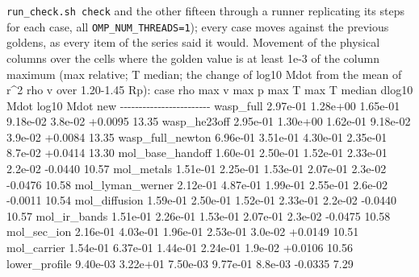\documentclass[english,a4paper]{my_memo}
\begin{document}
\begin{itemize}
  \texttt{run\_check.sh\ check} and the other fifteen through a runner replicating
  its steps for each case, all \texttt{OMP\_NUM\_THREADS=1}); every case moves against
  the previous goldens, as every item of the series said it would.
  Movement of the physical columns over the cells where the golden value
  is at least 1e-3 of the column maximum (max relative; T median; the
  change of log10 Mdot from the mean of r\^{}2 rho v over 1.20-1.45 Rp):
  \textbar{} case \textbar{} rho max \textbar{} v max \textbar{} p max \textbar{} T max \textbar{} T median \textbar{} dlog10 Mdot \textbar{} log10 Mdot new \textbar{}
  \textbar-\/-\/-\textbar-\/-\/-\textbar-\/-\/-\textbar-\/-\/-\textbar-\/-\/-\textbar-\/-\/-\textbar-\/-\/-\textbar-\/-\/-\textbar{}
  \textbar{} wasp\_full \textbar{} 2.97e-01 \textbar{} 1.28e+00 \textbar{} 1.65e-01 \textbar{} 9.18e-02 \textbar{} 3.8e-02 \textbar{} +0.0095 \textbar{} 13.35 \textbar{}
  \textbar{} wasp\_he23off \textbar{} 2.95e-01 \textbar{} 1.30e+00 \textbar{} 1.62e-01 \textbar{} 9.18e-02 \textbar{} 3.9e-02 \textbar{} +0.0084 \textbar{} 13.35 \textbar{}
  \textbar{} wasp\_full\_newton \textbar{} 6.96e-01 \textbar{} 3.51e-01 \textbar{} 4.30e-01 \textbar{} 2.35e-01 \textbar{} 8.7e-02 \textbar{} +0.0414 \textbar{} 13.30 \textbar{}
  \textbar{} mol\_base\_handoff \textbar{} 1.60e-01 \textbar{} 2.50e-01 \textbar{} 1.52e-01 \textbar{} 2.33e-01 \textbar{} 2.2e-02 \textbar{} -0.0440 \textbar{} 10.57 \textbar{}
  \textbar{} mol\_metals \textbar{} 1.51e-01 \textbar{} 2.25e-01 \textbar{} 1.53e-01 \textbar{} 2.07e-01 \textbar{} 2.3e-02 \textbar{} -0.0476 \textbar{} 10.58 \textbar{}
  \textbar{} mol\_lyman\_werner \textbar{} 2.12e-01 \textbar{} 4.87e-01 \textbar{} 1.99e-01 \textbar{} 2.55e-01 \textbar{} 2.6e-02 \textbar{} -0.0011 \textbar{} 10.54 \textbar{}
  \textbar{} mol\_diffusion \textbar{} 1.59e-01 \textbar{} 2.50e-01 \textbar{} 1.52e-01 \textbar{} 2.33e-01 \textbar{} 2.2e-02 \textbar{} -0.0440 \textbar{} 10.57 \textbar{}
  \textbar{} mol\_ir\_bands \textbar{} 1.51e-01 \textbar{} 2.26e-01 \textbar{} 1.53e-01 \textbar{} 2.07e-01 \textbar{} 2.3e-02 \textbar{} -0.0475 \textbar{} 10.58 \textbar{}
  \textbar{} mol\_sec\_ion \textbar{} 2.16e-01 \textbar{} 4.03e-01 \textbar{} 1.96e-01 \textbar{} 2.53e-01 \textbar{} 3.0e-02 \textbar{} +0.0149 \textbar{} 10.51 \textbar{}
  \textbar{} mol\_carrier \textbar{} 1.54e-01 \textbar{} 6.37e-01 \textbar{} 1.44e-01 \textbar{} 2.24e-01 \textbar{} 1.9e-02 \textbar{} +0.0106 \textbar{} 10.56 \textbar{}
  \textbar{} lower\_profile \textbar{} 9.40e-03 \textbar{} 3.22e+01 \textbar{} 7.50e-03 \textbar{} 9.77e-01 \textbar{} 8.8e-03 \textbar{} -0.0335 \textbar{} 7.29 \textbar{}

\end{itemize}
\end{document}
